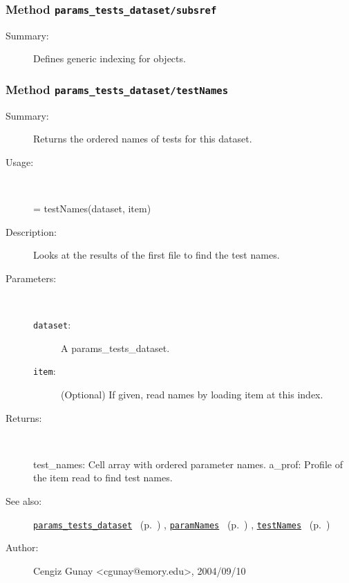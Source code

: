 \subsubsection[Method \texttt{subsref}]{Method \texttt{params\_tests\_dataset/subsref}}%
%
\label{ref_params_tests_dataset__subsref}%
\hypertarget{ref_params_tests_dataset__subsref}{}%
\begin{description}
\item[Summary:]Defines generic indexing for objects.
%
%
%
%
%
%
%
%
\end{description}
\methodline%
\subsubsection[Method \texttt{testNames}]{Method \texttt{params\_tests\_dataset/testNames}}%
%
\label{ref_params_tests_dataset__testNames}%
\hypertarget{ref_params_tests_dataset__testNames}{}%
\begin{description}
\item[Summary:]Returns the ordered names of tests for this dataset.
%
\item[Usage:]~%
\begin{lyxcode}%
[test\_names a\_prof] = testNames(dataset, item)
%
\end{lyxcode}%
%
\item[Description:]%
Looks at the results of the first file to find the test names.
\item[Parameters:]~
\begin{description}%
\item[\texttt{dataset}:]
 A params\_tests\_dataset.
\item[\texttt{item}:]
 (Optional) If given, read names by loading item at this index.
\end{description}%
%
\item[Returns:
]~

   test\_names: Cell array with ordered parameter names.
   a\_prof: Profile of the item read to find test names.
%
%
\item[See also:]%
\hyperlink{ref_params_tests_dataset}{\texttt{params\_tests\_dataset}}%
\ (p.~\pageref{ref_params_tests_dataset})%
%
, \hyperlink{ref_paramNames}{\texttt{paramNames}}%
\ (p.~\pageref{ref_paramNames})%
%
, \hyperlink{ref_testNames}{\texttt{testNames}}%
\ (p.~\pageref{ref_testNames})%
%
%
\item[Author:]%
Cengiz Gunay <cgunay@emory.edu>, 2004/09/10
%
\end{description}
\methodline%
